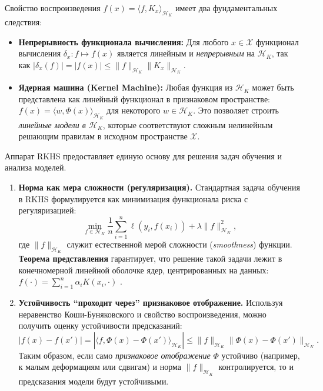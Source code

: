\documentclass[../NDCNNAI_main.tex]{subfiles}
\begin{document}
Свойство воспроизведения \( f(x) = \langle f, K_x \rangle_{\mathcal{H}_K} \) имеет два фундаментальных следствия:
\begin{itemize}
    \item \textbf{Непрерывность функционала вычисления:} Для любого \( x \in \mathcal{X} \) функционал вычисления \( \delta_x: f \mapsto f(x) \) является линейным и \emph{непрерывным} на \(\mathcal{H}_K\), так как \( |\delta_x(f)| = |f(x)| \leq \|f\|_{\mathcal{H}_K} \|K_x\|_{\mathcal{H}_K} \).
    \item \textbf{Ядерная машина (Kernel Machine):} Любая функция из \(\mathcal{H}_K\) может быть представлена как линейный функционал в признаковом пространстве: \( f(x) = \langle w, \Phi(x) \rangle_{\mathcal{H}_K} \) для некоторого \( w \in \mathcal{H}_K \). Это позволяет строить \emph{линейные модели в \(\mathcal{H}_K\)}, которые соответствуют сложным нелинейным решающим правилам в исходном пространстве \(\mathcal{X}\).
\end{itemize}

Аппарат RKHS предоставляет единую основу для решения задач обучения и анализа моделей.
\begin{enumerate}
    \item \textbf{Норма как мера сложности (регуляризация).} Стандартная задача обучения в RKHS формулируется как минимизация функционала риска с регуляризацией:
    \[
    \min_{f \in \mathcal{H}_K} \frac{1}{n} \sum_{i=1}^{n} \ell(y_i, f(x_i)) + \lambda \|f\|^2_{\mathcal{H}_K},
    \]
    где \( \|f\|_{\mathcal{H}_K} \) служит естественной мерой сложности (\emph{smoothness}) функции. \textbf{Теорема представления} гарантирует, что решение такой задачи лежит в конечномерной линейной оболочке ядер, центрированных на данных: \( f(\cdot) = \sum_{i=1}^n \alpha_i K(x_i, \cdot) \) \cite{Bietti_Group}.

    \item \textbf{Устойчивость ``проходит через'' признаковое отображение.} Используя неравенство Коши-Буняковского и свойство воспроизведения, можно получить оценку устойчивости предсказаний:
    \[
    |f(x) - f(x')| = |\langle f, \Phi(x) - \Phi(x')\rangle_{\mathcal{H}_K}| \leq \|f\|_{\mathcal{H}_K} \|\Phi(x) - \Phi(x')\|_{\mathcal{H}_K}.
    \]
    Таким образом, если само \emph{признаковое отображение} \(\Phi\) устойчиво (например, к малым деформациям или сдвигам) и норма \(\|f\|_{\mathcal{H}_K}\) контролируется, то и предсказания модели будут устойчивыми.
\end{enumerate}
\end{document}

